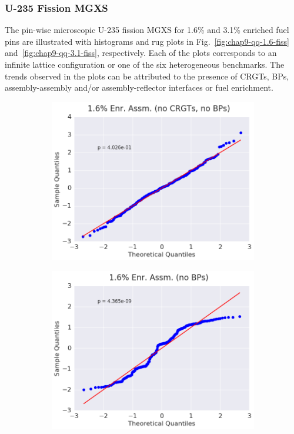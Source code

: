 \subsubsection{U-235 Fission MGXS}
\label{subsubsec:chap9-qq-plots-fiss}

The pin-wise microscopic U-235 fission \ac{MGXS} for 1.6\% and 3.1\% enriched fuel pins are illustrated with histograms and rug plots in Fig.~\ref{fig:chap9-qq-1.6-fiss} and~\ref{fig:chap9-qq-3.1-fiss}, respectively. Each of the plots corresponds to an infinite lattice configuration or one of the six heterogeneous benchmarks. The trends observed in the plots can be attributed to the presence of \acp{CRGT}, \acp{BP}, assembly-assembly and/or assembly-reflector interfaces or fuel enrichment. 

\begin{figure}[h!]
\centering
\begin{subfigure}{0.5\textwidth}
  \centering
  \includegraphics[width=\linewidth]{figures/patterns/assm-1.6-inf/quantile/assm-16-inf-fiss-2}
  \caption{}
  \label{fig:chap9-qq-assm-1.6-inf-fiss}
\end{subfigure}%
\begin{subfigure}{0.5\textwidth}
  \centering
  \includegraphics[width=\linewidth]{figures/patterns/assm-1.6/quantile/assm-16-fiss-2}

\end{subfigure}
\end{figure}
